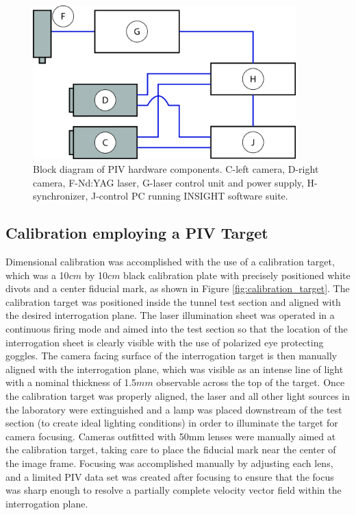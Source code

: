 \vspace{32pt}
\begin{figure}[H]
	\centering
	\includegraphics[width=4in]{figs/piv_method/experiment_block_diagram}
	\caption{Block diagram of PIV hardware components. C-left camera, D-right 
		camera, F-Nd:YAG laser, G-laser control unit and power supply, 
		H-synchronizer, 
		J-control PC running INSIGHT software suite.}
	\label{fig:pivblockdiagram}
\end{figure}

\subsection{Calibration employing a PIV Target}

Dimensional calibration was accomplished with the use of a calibration target, 
which was a 10$cm$ by 10$cm$ black calibration plate with precisely positioned 
white divots and a center fiducial mark, as shown in Figure 
\ref{fig:calibration_target}. The calibration target was positioned inside the 
tunnel test section and aligned with the desired interrogation plane. 
The laser illumination sheet was operated in a continuous firing mode and aimed 
into the test section so that the location of the interrogation sheet is 
clearly visible with the use of polarized eye protecting goggles. The camera 
facing surface of the 
interrogation target is then manually aligned with the interrogation plane, 
which was visible as an intense line of light with a nominal thickness of 
1.5$mm$ observable across the top of the target. Once the calibration target 
was properly aligned, the laser and all other light sources in the laboratory 
were extinguished and a lamp was placed downstream of the test section (to 
create ideal lighting conditions) in order to illuminate the target for camera 
focusing. Cameras outfitted with 50mm lenses were manually aimed at the 
calibration target, taking care to place the fiducial mark near the center of 
the image frame. Focusing was accomplished manually by adjusting each lens, and 
a limited PIV data set was created after focusing to ensure that the focus was 
sharp enough to resolve a partially complete velocity vector field within the 
interrogation plane.

